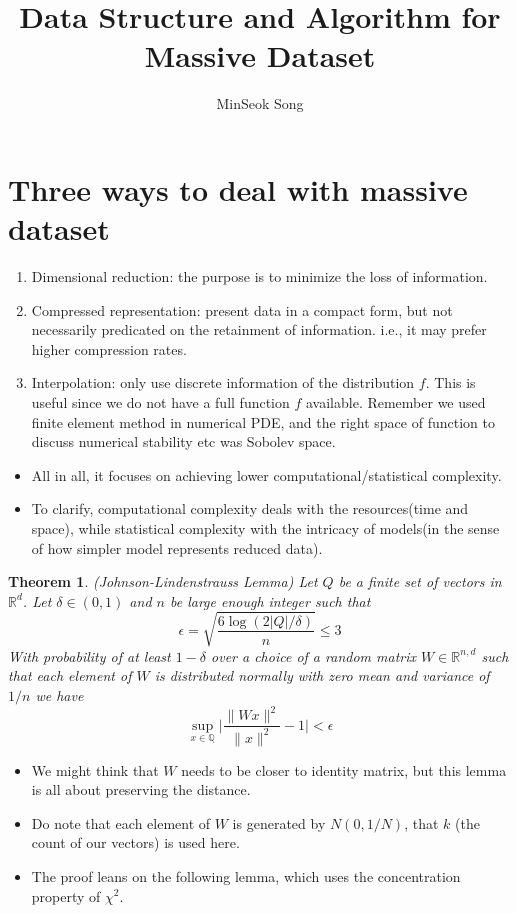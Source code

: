 \documentclass[11pt,reqno]{amsart}
\title{Data Structure and Algorithm for Massive Dataset}
\author{MinSeok Song}
\date{}
\newtheorem{theorem}{Theorem}
\theoremstyle{remark}
\begin{document}
\maketitle
\section*{Three ways to deal with massive dataset}
\begin{enumerate}
\item Dimensional reduction: the purpose is to minimize the loss of information.
\item Compressed representation: present data in a compact form, but not necessarily predicated on the retainment 
of information. i.e., it may prefer higher compression rates.
\item Interpolation: only use discrete information of the distribution $f$. 
This is useful since we do not have a full function $f$ available. Remember we 
used finite element method in numerical PDE, and the right space of function to discuss
 numerical stability etc was Sobolev space.
\end{enumerate}
\begin{itemize}
\item All in all, it focuses on achieving lower computational/statistical complexity.
\item To clarify, computational complexity deals with the resources(time and space), 
while statistical complexity with the intricacy of models(in the sense of how simpler model represents reduced data). 
\end{itemize}
\begin{theorem} (Johnson-Lindenstrauss Lemma)
Let $Q$ be a finite set of vectors in $\mathbb{R}^d$. Let $\delta\in (0,1)$ and $n$ be large enough integer such that
\begin{equation}
\epsilon = \sqrt{\frac{6\log (2\lvert Q\rvert/\delta)}n}\leq 3
\end{equation}
With probability of at least $1-\delta$ over a choice of a random matrix $W\in\mathbb{R}^{n,d}$
 such that each element of $W$ is distributed normally with zero mean and variance of $1/n$ we have
\begin{equation}
\sup_{x\in\mathbb{Q}}\lvert \frac{\lVert Wx\rVert^2}{\lVert x\rVert^2}-1\rvert < \epsilon
\end{equation}
\end{theorem}
\begin{itemize}
\item We might think that $W$ needs to be closer to identity matrix, but this lemma is all about preserving the distance.
\item Do note that each element of $W$ is generated by $N(0,1/N)$, that $k$ (the count of our vectors) is used here.
\item The proof leans on the following lemma, which uses the concentration property of $\chi^2$.
\end{itemize}
\end{document}
